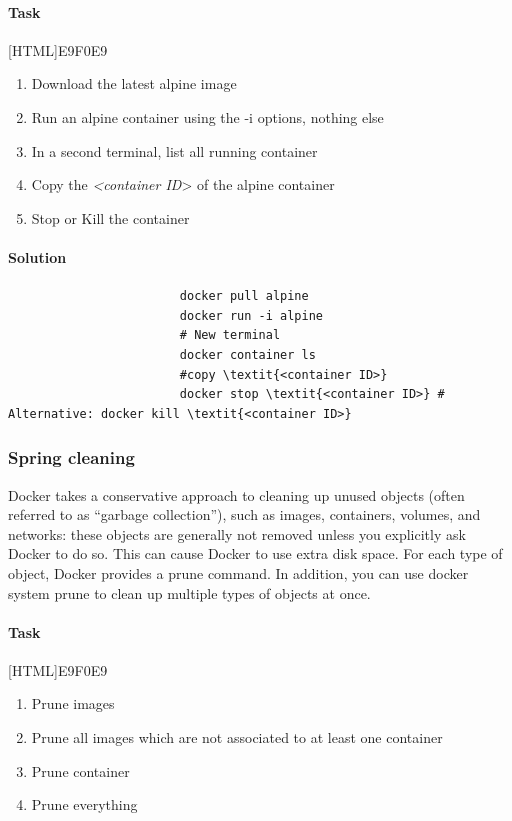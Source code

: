 \documentclass[12pt]{article}
\begin{document}
					\paragraph{Task}
						[HTML]{E9F0E9}{\parbox{\linewidth}{%
							\begin{enumerate}
								\item Download the latest alpine image
								\item Run an alpine container using the -i options, nothing else
								\item In a second terminal, list all running container
								\item Copy the \textit{<container ID}> of the alpine container
								\item Stop or Kill the container
							\end{enumerate}
					}}
					
			\paragraph{Solution}	

				\begin{minipage}{\linewidth}
					\begin{lstlisting}
						docker pull alpine
						docker run -i alpine
						# New terminal
						docker container ls
						#copy \textit{<container ID>}
						docker stop \textit{<container ID>} # Alternative: docker kill \textit{<container ID>}
					\end{lstlisting}
				\end{minipage}

				\subsubsection{Spring cleaning}
					Docker takes a conservative approach to cleaning up unused objects (often referred to as “garbage collection”), such as images, containers, volumes, and networks: these objects are generally not removed unless you explicitly ask Docker to do so. 
					This can cause Docker to use extra disk space. 
					For each type of object, Docker provides a prune command. 
					In addition, you can use docker system prune to clean up multiple types of objects at once. 
					
					\paragraph{Task}
						[HTML]{E9F0E9}{\parbox{\linewidth}{%
							\begin{enumerate}
								\item Prune images
								\item Prune all images which are not associated to at least one container
								\item Prune container
								\item Prune everything
							\end{enumerate}
						}}
				
\end{document}

